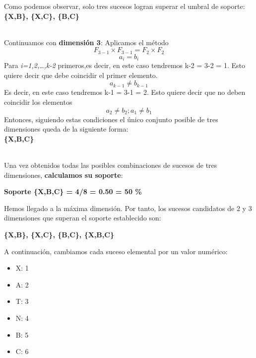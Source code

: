 \documentclass [a4paper] {article}
\begin{document}
\hfil Como podemos observar, solo tres sucesos logran superar el umbral de soporte: \textbf{\{X,B\}, \{X,C\}, \{B,C\}} \par \leavevmode
\\[1\baselineskip]
Continuamos con \textbf{dimensión 3}:
Aplicamos el método \begin{equation*} F_{3-1} \times F_{3-1} = F_{2} \times F_{2} \end{equation*}
\begin{equation*} a_{i}=b_{i} \end{equation*}  
Para \textit{i=1,2,…,k-2} primeros,es decir, en este caso tendremos k-2 = 3-2 = 1. Esto quiere decir que debe coincidir el primer elemento.
\begin{equation*} a_{k-1} \neq b_{k-1} \end{equation*} 
Es decir, en este caso tendremos k-1 = 3-1 = 2. Esto quiere decir que no deben coincidir los elementos 
\begin{equation*} a_{2} \neq b_{2} ; a_{1} \neq b_{1} \end{equation*}
Entonces, siguiendo estas condiciones el único conjunto posible de tres dimensiones queda de la siguiente forma:
\\[1\baselineskip]

\hfil \textbf{\{X,B,C\}} \par \leavevmode
\\[1\baselineskip]
Una vez obtenidos todas las posibles combinaciones de sucesos de tres dimensiones, \textbf{calculamos su soporte}:

\hfil \textbf{Soporte \{X,B,C\} = 4/8 = 0.50 = 50 \%} \par

\newpage
Hemos llegado a la máxima dimensión. Por tanto, los sucesos candidatos de 2 y 3 dimensiones que superan el soporte establecido son:

\hfil \textbf{\{X,B\}, \{X,C\}, \{B,C\}, \{X,B,C\}} \par

A continuación, cambiamos cada suceso elemental por un valor numérico:
\begin{itemize}
	\item X: 1
	\item A: 2
	\item T: 3
	\item N: 4
	\item B: 5
	\item C: 6
\end{itemize}
\end{document}
